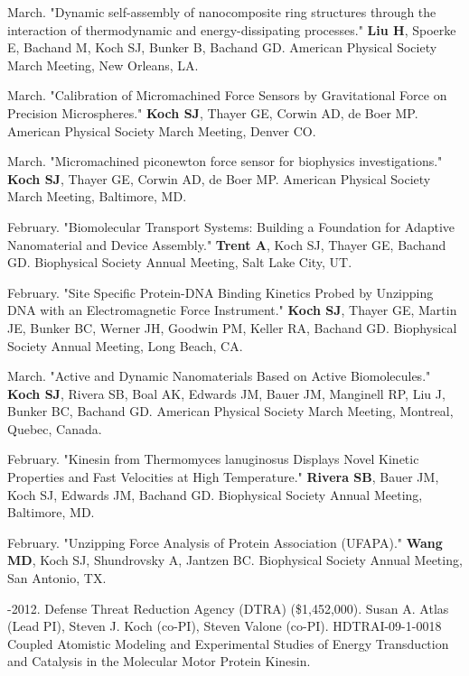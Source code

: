 \documentclass[11pt]{article}
\begin{document}
 March. "Dynamic self-assembly of nanocomposite ring structures through the interaction of thermodynamic and energy-dissipating processes." \textbf{Liu H}, Spoerke E, Bachand M, Koch SJ, Bunker B, Bachand GD.  American Physical Society March Meeting, New Orleans, LA.

 March. "Calibration of Micromachined Force Sensors by Gravitational Force on Precision Microspheres." \textbf{Koch SJ}, Thayer GE, Corwin AD, de Boer MP. American Physical Society March Meeting, Denver CO.

 March. "Micromachined piconewton force sensor for biophysics investigations." \textbf{Koch SJ}, Thayer GE, Corwin AD, de Boer MP. American Physical Society March Meeting, Baltimore, MD.

 February. "Biomolecular Transport Systems: Building a Foundation for Adaptive Nanomaterial and Device Assembly." \textbf{Trent A}, Koch SJ, Thayer GE, Bachand GD. Biophysical Society Annual Meeting, Salt Lake City, UT.

 February. "Site Specific Protein-DNA Binding Kinetics Probed by Unzipping DNA with an Electromagnetic Force Instrument." \textbf{Koch SJ}, Thayer GE, Martin JE, Bunker BC, Werner JH, Goodwin PM, Keller RA, Bachand GD. Biophysical Society Annual Meeting, Long Beach, CA.

 March. "Active and Dynamic Nanomaterials Based on Active Biomolecules." \textbf{Koch SJ}, Rivera SB, Boal AK, Edwards JM, Bauer JM, Manginell RP, Liu J, Bunker BC, Bachand GD. American Physical Society March Meeting, Montreal, Quebec, Canada.

 February. "Kinesin from Thermomyces lanuginosus Displays Novel Kinetic Properties and Fast Velocities at High Temperature." \textbf{Rivera SB}, Bauer JM, Koch SJ, Edwards JM, Bachand GD. Biophysical Society Annual Meeting, Baltimore, MD.

 February. "Unzipping Force Analysis of Protein Association (UFAPA)." \newline \textbf{Wang MD}, Koch SJ, Shundrovsky A, Jantzen BC. Biophysical Society Annual Meeting, San Antonio, TX.

\bigskip

\medskip
  
-2012. Defense Threat Reduction Agency (\textsc{DTRA}) (\$1,452,000). Susan A. Atlas (Lead PI), Steven J. Koch (co-PI), Steven Valone (co-PI). HDTRAI-09-1-0018 Coupled Atomistic Modeling and Experimental Studies of Energy Transduction and Catalysis in the Molecular Motor Protein Kinesin.
\end{document}
